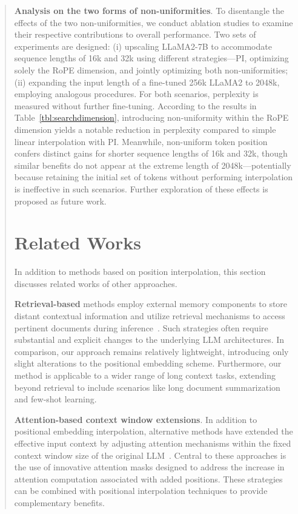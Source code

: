 \begin{abstract}
\textbf{Analysis on the two forms of non-uniformities}. To disentangle the effects of the two non-uniformities, we conduct ablation studies to examine their respective contributions to overall performance. Two sets of experiments are designed: (i) upscaling LLaMA2-7B to accommodate sequence lengths of 16k and 32k using different strategies—PI, optimizing solely the RoPE dimension, and jointly optimizing both non-uniformities; (ii) expanding the input length of a fine-tuned 256k LLaMA2 to 2048k, employing analogous procedures. For both scenarios, perplexity is measured without further fine-tuning. According to the results in Table~\ref{tbl:searchdimension}, introducing non-uniformity within the RoPE dimension yields a notable reduction in perplexity compared to simple linear interpolation with PI. Meanwhile, non-uniform token position confers distinct gains for shorter sequence lengths of 16k and 32k, though similar benefits do not appear at the extreme length of 2048k—potentially because retaining the initial set of tokens without performing interpolation is ineffective in such scenarios. Further exploration of these effects is proposed as future work.

\section{Related Works}

In addition to methods based on position interpolation, this section discusses related works of other approaches. 

\textbf{Retrieval-based} methods employ external memory components to store distant contextual information and utilize retrieval mechanisms to access pertinent documents during inference~\cite{longllama,wang2023augmenting,borgeaud2022improving}. Such strategies often require substantial and explicit changes to the underlying LLM architectures. In comparison, our approach remains relatively lightweight, introducing only slight alterations to the positional embedding scheme. Furthermore, our method is applicable to a wider range of long context tasks, extending beyond retrieval to include scenarios like long document summarization and few-shot learning.

\textbf{Attention-based context window extensions}. In addition to positional embedding interpolation, alternative methods have extended the effective input context by adjusting attention mechanisms within the fixed context window size of the original LLM~\cite{han2023lminfinite, streamingllm,parallelwindow}. Central to these approaches is the use of innovative attention masks designed to address the increase in attention computation associated with added positions. These strategies can be combined with positional interpolation techniques to provide complementary benefits.


\end{abstract}
